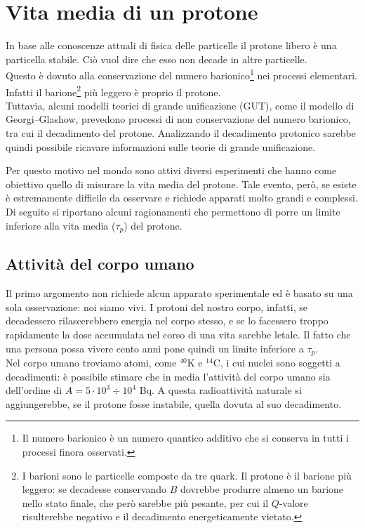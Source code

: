 \chapter{Vita media di un protone}

In base alle conoscenze attuali di fisica delle particelle il protone libero è una particella stabile. Ciò vuol dire che esso non decade in altre particelle.\\
Questo è dovuto alla conservazione del numero barionico\footnote{Il numero barionico è un numero quantico additivo che si conserva in tutti i processi finora osservati.} nei processi elementari. Infatti il barione\footnote{I barioni sono le particelle composte da tre quark. Il protone è il barione più leggero: se decadesse conservando $B$ dovrebbe produrre almeno un barione nello stato finale, che però sarebbe più pesante, per cui il $Q$-valore risulterebbe negativo e il decadimento energeticamente vietato.} più leggero è proprio il protone.\\
Tuttavia, alcuni modelli teorici di grande unificazione (GUT), come il modello di Georgi--Glashow, prevedono processi di non conservazione del numero barionico, tra cui il decadimento del protone. Analizzando il decadimento protonico sarebbe quindi possibile ricavare informazioni sulle teorie di grande unificazione.

Per questo motivo nel mondo sono attivi diversi esperimenti che hanno come obiettivo quello di misurare la vita media del protone. Tale evento, però, se esiste è estremamente difficile da osservare e richiede apparati molto grandi e complessi.\\

Di seguito si riportano alcuni ragionamenti che permettono di porre un limite inferiore alla vita media ($\tau_p$) del protone. 

\section{Attività del corpo umano}

Il primo argomento non richiede alcun apparato sperimentale ed è basato su una sola osservazione: noi siamo vivi. I protoni del nostro corpo, infatti, se decadessero rilascerebbero energia nel corpo stesso, e se lo facessero troppo rapidamente la dose accumulata nel corso di una vita sarebbe letale. Il fatto che una persona possa vivere cento anni pone quindi un limite inferiore a $\tau_p$.\\

Nel corpo umano troviamo atomi, come $^{40}\mathrm{K}$ e $^{14}\mathrm{C}$, i cui nuclei sono soggetti a decadimenti: è possibile stimare che in media l'attività del corpo umano sia dell'ordine di $A = 5 \cdot 10^3 \div 10^4$ Bq. A questa radioattività naturale si aggiungerebbe, se il protone fosse instabile, quella dovuta al suo decadimento. 

